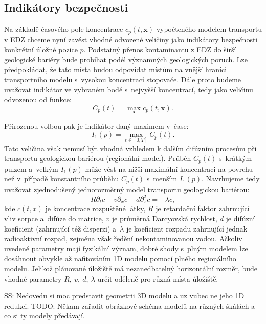 \documentclass{article}
\def\vc#1{\mathbf{\boldsymbol{#1}}}     %
\def\jb#1{{\color{violet}#1}}
\newcommand{\sy}[1]{{\color{blue} SS: #1}}
\begin{document}
\subsection{Indikátory bezpečnosti}
\label{sec:indikatory}
Na základě časového pole koncentrace $c_p(t, \vc x)$ vypočteného modelem transportu v EDZ chceme nyní zavést vhodné odvozené veličiny jako indikátory bezpečnosti konkrétní úložné pozice $p$. Podstatný přenos kontaminantu z EDZ do širší geologické bariéry bude probíhat podél významných geologických poruch. 
Lze předpokládat, že tato místa budou odpovídat místům na vnější hranici transportního modelu s~vysokou koncentrací stopovače. 
Dále proto budeme uvažovat indikátor ve vybraném bodě s~nejvyšší koncentrací, tedy jako veličinu odvozenou od funkce:
\[
  C_p(t) = \max_{\vc x} c_p(t, \vc x).
\]

Přirozenou volbou pak je indikátor daný maximem v~čase:
\begin{equation}
    I_1(p)  = \max_{t\in[0, T]} C_p(t).
\end{equation}
Tato veličina však nemusí být vhodná vzhledem k dalším difúzním procesům při transportu geologickou bariérou (regionální model).
Průběh $C_p(t)$ s~krátkým pulzem a~velkým $I_1(p)$ může vést na nižší maximální koncentraci na povrchu než v~případě konstantního průběhu $C_p(t)$ s~menším  $I_1(p)$. Navrhujeme tedy uvažovat zjednodušený jednorozměrný model transportu geologickou bariérou:
\begin{equation}
    \label{eq:ad}
    R\partial_t c + v \partial_x c - d \partial^2_x c = - \lambda c,
\end{equation}
kde $c(t,x)$ je koncentrace rozpuštěné látky, $R$ je retardační faktor zahrnující vliv sorpce a~difúze do matrice, $v$ je průměrná Darcyovská rychlost, $d$ je difúzní koeficient (zahrnující též disperzi) a~$\lambda$ je koeficient rozpadu zahrnující jednak radioaktivní rozpad, zejména však ředění nekontaminovanou vodou. Ačkoliv uvedené parametry mají fyzikální význam, dobré shody s~plným modelem lze dosáhnout obvykle až nafitováním 1D modelu pomocí plného regionálního modelu. Jelikož plánované úložiště má nezanedbatelný horizontální rozměr, bude vhodné parametry $R,\ v,\ d,\ \lambda$ určit 
oděleně pro různá místa úložiště. 


\sy{Nedovedu si moc predstavit geometrii 3D modelu a uz vubec ne jeho 1D redukci.}
\jb{TODO: Někam zařadit obrázkové schéma modelů na různých škálách a co si ty modely předávají.}
\end{document}
